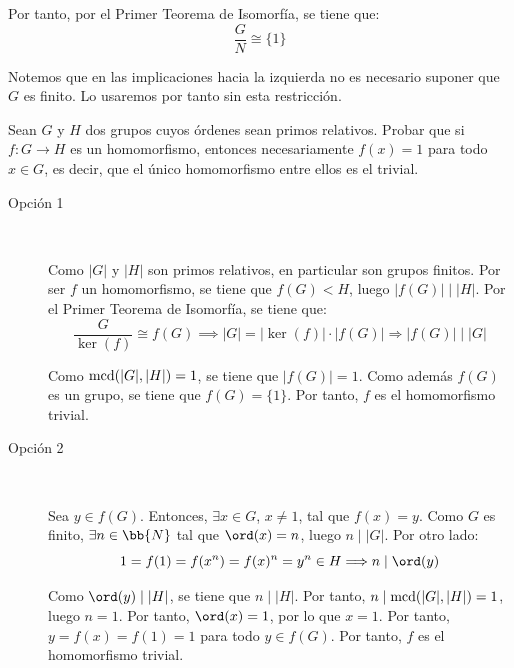 \begin{ejercicio}
\begin{description}
        Por tanto, por el Primer Teorema de Isomorfía, se tiene que:
        \begin{equation*}
            \dfrac{G}{N}\cong \{1\}
        \end{equation*}
    \end{description}
    \begin{observacion}
        Notemos que en las implicaciones hacia la izquierda no es necesario suponer que $G$ es finito. Lo usaremos por tanto sin esta restricción.
    \end{observacion}
\end{ejercicio}

\begin{ejercicio}
    Sean $G$ y $H$ dos grupos cuyos órdenes sean primos relativos. Probar que si $f:G\to H$ es un homomorfismo, entonces necesariamente $f(x)=1$ para todo $x\in G$, es decir, que el único homomorfismo entre ellos es el trivial.\\

    \begin{description}
        \item[Opción 1]~
        
        Como $|G|$ y $|H|$ son primos relativos, en particular son grupos finitos.    Por ser $f$ un homomorfismo, se tiene que $f(G)<H$, luego $|f(G)|\mid |H|$. Por el Primer Teorema de Isomorfía, se tiene que:
    \begin{equation*}
        \dfrac{G}{\ker(f)}\cong f(G) \implies |G| = |\ker(f)|\cdot |f(G)|\Longrightarrow |f(G)|\mid |G|
    \end{equation*}

    Como $\operatorname{mcd}(|G|,|H|)=1$, se tiene que $|f(G)|=1$. Como además $f(G)$ es un grupo, se tiene que $f(G)=\{1\}$. Por tanto, $f$ es el homomorfismo trivial.

        \item[Opción 2]~
        
        Sea $y\in f(G)$. Entonces, $\exists x\in G$, $x\neq 1$, tal que $f(x)=y$. Como $G$ es finito, $\exists n\in \bb{N}$ tal que $\ord(x)=n$, luego $n\mid |G|$. Por otro lado:
        \begin{equation*}
            1=f(1)=f(x^n)=f(x)^n=y^n\in H\Longrightarrow n\mid \ord(y)
        \end{equation*}

        Como $\ord(y)\mid |H|$, se tiene que $n\mid |H|$. Por tanto, $n\mid \operatorname{mcd}(|G|,|H|)=1$, luego $n=1$. Por tanto, $\ord(x)=1$, por lo que $x=1$. Por tanto, $y=f(x)=f(1)=1$ para todo $y\in f(G)$. Por tanto, $f$ es el homomorfismo trivial.
    \end{description}
\end{ejercicio}

